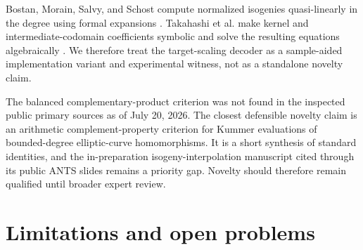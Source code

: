 \documentclass[11pt]{article}
\begin{document}
Bostan, Morain, Salvy, and Schost compute normalized isogenies quasi-linearly
in the degree using formal expansions \cite{bmss}.  Takahashi et al. make
kernel and intermediate-codomain coefficients symbolic and solve the
resulting equations algebraically \cite{takahashi-kernel}.  We therefore treat
the target-scaling decoder as a sample-aided implementation variant and
experimental witness, not as a standalone novelty claim.

The balanced complementary-product criterion was not found in the inspected
public primary sources as of July 20, 2026.  The closest defensible novelty
claim is an arithmetic complement-property criterion for Kummer evaluations
of bounded-degree elliptic-curve homomorphisms.  It is a short synthesis of
standard identities, and the in-preparation isogeny-interpolation manuscript
cited through its public ANTS slides remains a priority gap.  Novelty should
therefore remain qualified until broader expert review.

\section{Limitations and open problems}
\end{document}
